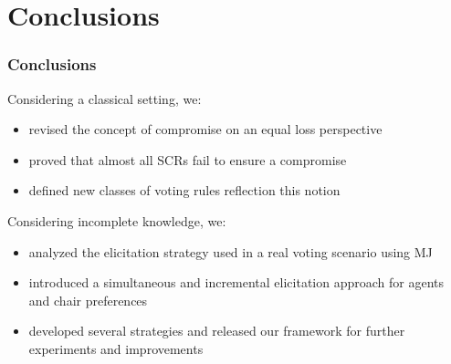 \documentclass{beamer}
\begin{document}
\section{Conclusions}
\begin{frame}
	\frametitle{Conclusions}
\begin{block}{Considering a classical setting, we:}
	\begin{itemize}
		\item revised the concept of compromise on an equal loss perspective
		\item proved that almost all SCRs fail to ensure a compromise
		\item defined new classes of voting rules reflection this notion
	\end{itemize}
\end{block}
\begin{block}{Considering incomplete knowledge, we:}
	\begin{itemize}
	\item analyzed the elicitation strategy used in a real voting scenario using MJ
	\item introduced a simultaneous and incremental elicitation approach for agents and chair preferences
	\item developed several strategies and released our framework for further experiments and improvements
	\end{itemize}
\end{block}
\end{frame}
\end{document}

